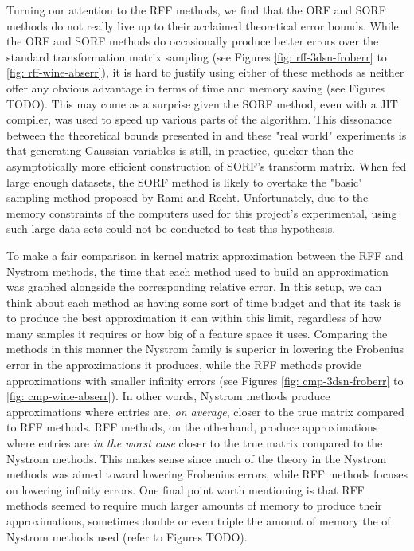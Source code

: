 Turning our attention to the RFF methods, we find that the ORF and SORF methods do not really live up to their acclaimed theoretical error bounds. While the ORF and SORF methods do occasionally produce better errors over the standard transformation matrix sampling (see Figures \ref{fig: rff-3dsn-froberr} to \ref{fig: rff-wine-abserr}), it is hard to justify using either of these methods as neither offer any obvious advantage in terms of time and memory saving (see Figures TODO). This may come as a surprise given the SORF method, even with a JIT compiler, was used to speed up various parts of the algorithm. This dissonance between the theoretical bounds presented in  and these "real world" experiments is that generating Gaussian variables is still, in practice, quicker than the asymptotically more efficient construction of SORF's transform matrix. When fed large enough datasets, the SORF method is likely to overtake the "basic" sampling method proposed by Rami and Recht. Unfortunately, due to the memory constraints of the computers used for this project's experimental, using such large data sets could not be conducted to test this hypothesis.

To make a fair comparison in kernel matrix approximation between the RFF and Nystrom methods, the time that each method used to build an approximation was graphed alongside the corresponding relative error. In this setup, we can think about each method as having some sort of time budget and that its task is to produce the best approximation it can within this limit, regardless of how many samples it requires or how big of a feature space it uses. Comparing the methods in this manner the Nystrom family is superior in lowering the Frobenius error in the approximations it produces, while the RFF methods provide approximations with smaller infinity errors (see Figures \ref{fig: cmp-3dsn-froberr} to \ref{fig: cmp-wine-abserr}). In other words, Nystrom methods produce approximations where entries are, {\it on average}, closer to the true matrix compared to RFF methods. RFF methods, on the otherhand, produce approximations where entries are {\it in the worst case} closer to the true matrix compared to the Nystrom methods. This makes sense since much of the theory in the Nystrom methods was aimed toward lowering Frobenius errors, while RFF methods focuses on lowering infinity errors. One final point worth mentioning is that RFF methods seemed to require much larger amounts of memory to produce their approximations, sometimes double or even triple the amount of memory the of Nystrom methods used (refer to Figures TODO).

